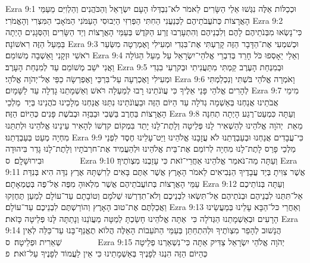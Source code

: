 Ezra 9:1	וּכְכַלּוֹת אֵלֶּה נִגְּשׁוּ אֵלַי הַשָּׂרִים לֵאמֹר לֹא־נִבְדְּלוּ הָעָם יִשְׂרָאֵל וְהַכֹּהֲנִים וְהַלְוִיִּם מֵעַמֵּי הָאֲרָצוֹת כְּתֹעֲבֹתֵיהֶם לַכְּנַעֲנִי הַחִתִּי הַפְּרִזִּי הַיְבוּסִי הָעַמֹּנִי הַמֹּאָבִי הַמִּצְרִי וְהָאֱמֹרִי׃
Ezra 9:2	כִּי־נָשְׂאוּ מִבְּנֹתֵיהֶם לָהֶם וְלִבְנֵיהֶם וְהִתְעָרְבוּ זֶרַע הַקֹּדֶשׁ בְּעַמֵּי הָאֲרָצוֹת וְיַד הַשָּׂרִים וְהַסְּגָנִים הָיְתָה בַּמַּעַל הַזֶּה רִאשׁוֹנָה׃
Ezra 9:3	וּכְשׁמְעִי אֶת־הַדָּבָר הַזֶּה קָרַעְתִּי אֶת־בִּגְדִי וּמְעִילִי וָאֶמְרְטָה מִשְּׂעַר רֹאשִׁי וּזְקָנִי וָאֵשְׁבָה מְשׁוֹמֵם׃
Ezra 9:4	וְאֵלַי יֵאָסְפוּ כֹּל חָרֵד בְּדִבְרֵי אֱלֹהֵי־יִשְׂרָאֵל עַל מַעַל הַגּוֹלָה וַאֲנִי יֹשֵׁב מְשׁוֹמֵם עַד לְמִנְחַת הָעָרֶב׃
Ezra 9:5	וּבְמִנְחַת הָעֶרֶב קַמְתִּי מִתַּעֲנִיתִי וּבְקרְעִי בִגְדִי וּמְעִילִי וָאֶכְרְעָה עַל־בִּרְכַּי וָאֶפְרְשָׂה כַפַּי אֶל־יְהֹוָה אֱלֹהָי׃
Ezra 9:6	וָאֹמְרָה אֱלֹהַי בֹּשְׁתִּי וְנִכְלַמְתִּי לְהָרִים אֱלֹהַי פָּנַי אֵלֶיךָ כִּי עֲוֺנֹתֵינוּ רָבוּ לְמַעְלָה רֹּאשׁ וְאַשְׁמָתֵנוּ גָדְלָה עַד לַשָּׁמָיִם׃
Ezra 9:7	מִימֵי אֲבֹתֵינוּ אֲנַחְנוּ בְּאַשְׁמָה גְדֹלָה עַד הַיּוֹם הַזֶּה וּבַעֲוֺנֹתֵינוּ נִתַּנּוּ אֲנַחְנוּ מְלָכֵינוּ כֹהֲנֵינוּ בְּיַד  מַלְכֵי הָאֲרָצוֹת בַּחֶרֶב בַּשְּׁבִי וּבַבִּזָּה וּבְבֹשֶׁת פָּנִים כְּהַיּוֹם הַזֶּה׃
Ezra 9:8	וְעַתָּה כִּמְעַט־רֶגַע הָיְתָה תְחִנָּה מֵאֵת  יְהֹוָה אֱלֹהֵינוּ לְהַשְׁאִיר לָנוּ פְּלֵיטָה וְלָתֶת־לָנוּ יָתֵד בִּמְקוֹם קדְשׁוֹ לְהָאִיר עֵינֵינוּ אֱלֹהֵינוּ וּלְתִתֵּנוּ מִחְיָה מְעַט בְּעַבְדֻתֵנוּ׃
Ezra 9:9	כִּי־עֲבָדִים אֲנַחְנוּ וּבְעַבְדֻתֵנוּ לֹא עֲזָבָנוּ אֱלֹהֵינוּ וַיַּט־עָלֵינוּ חֶסֶד לִפְנֵי מַלְכֵי פָרַס לָתֶת־לָנוּ מִחְיָה לְרוֹמֵם אֶת־בֵּית אֱלֹהֵינוּ וּלְהַעֲמִיד אֶת־חרְבֹתָיו וְלָתֶת־לָנוּ גָדֵר בִּיהוּדָה וּבִירוּשָׁלָ͏ִם׃ {ס}        
Ezra 9:10	וְעַתָּה מַה־נֹּאמַר אֱלֹהֵינוּ אַחֲרֵי־זֹאת כִּי עָזַבְנוּ מִצְוֺתֶיךָ׃
Ezra 9:11	אֲשֶׁר צִוִּיתָ בְּיַד עֲבָדֶיךָ הַנְּבִיאִים לֵאמֹר הָאָרֶץ אֲשֶׁר אַתֶּם בָּאִים לְרִשְׁתָּהּ אֶרֶץ נִדָּה הִיא בְּנִדַּת עַמֵּי הָאֲרָצוֹת בְּתוֹעֲבֹתֵיהֶם אֲשֶׁר מִלְאוּהָ מִפֶּה אֶל־פֶּה בְּטֻמְאָתָם׃
Ezra 9:12	וְעַתָּה בְּנוֹתֵיכֶם אַל־תִּתְּנוּ לִבְנֵיהֶם וּבְנֹתֵיהֶם אַל־תִּשְׂאוּ לִבְנֵיכֶם וְלֹא־תִדְרְשׁוּ שְׁלֹמָם וְטוֹבָתָם עַד־עוֹלָם לְמַעַן תֶּחֶזְקוּ וַאֲכַלְתֶּם אֶת־טוּב הָאָרֶץ וְהוֹרַשְׁתֶּם לִבְנֵיכֶם עַד־עוֹלָם׃
Ezra 9:13	וְאַחֲרֵי כּל־הַבָּא עָלֵינוּ בְּמַעֲשֵׂינוּ הָרָעִים וּבְאַשְׁמָתֵנוּ הַגְּדֹלָה כִּי  אַתָּה אֱלֹהֵינוּ חָשַׂכְתָּ לְמַטָּה מֵעֲוֺנֵנוּ וְנָתַתָּה לָּנוּ פְּלֵיטָה כָּזֹאת׃
Ezra 9:14	הֲנָשׁוּב לְהָפֵר מִצְוֺתֶיךָ וּלְהִתְחַתֵּן בְּעַמֵּי הַתֹּעֵבוֹת הָאֵלֶּה הֲלוֹא תֶאֱנַף־בָּנוּ עַד־כַּלֵּה לְאֵין שְׁאֵרִית וּפְלֵיטָה׃ {ס}        
Ezra 9:15	יְהֹוָה אֱלֹהֵי יִשְׂרָאֵל צַדִּיק אַתָּה כִּי־נִשְׁאַרְנוּ פְלֵיטָה כְּהַיּוֹם הַזֶּה הִנְנוּ לְפָנֶיךָ בְּאַשְׁמָתֵינוּ כִּי אֵין לַעֲמוֹד לְפָנֶיךָ עַל־זֹאת׃ {פ}
